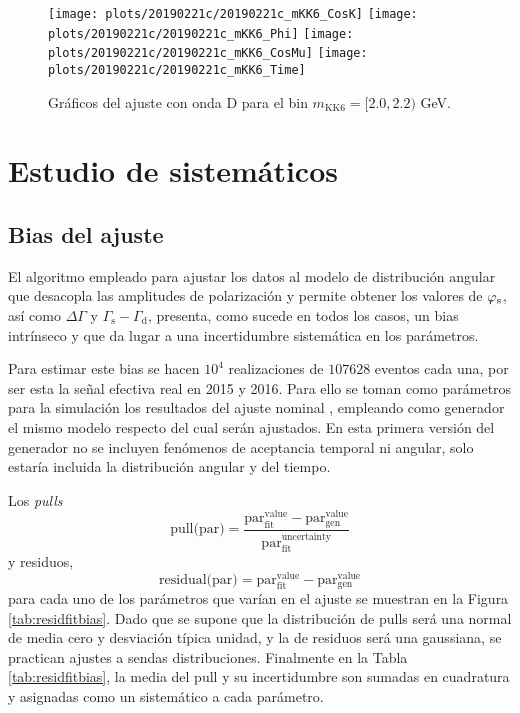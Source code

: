 \begin{figure}[H]
\centering
\begin{multicols}{2}
\texttt{[image: plots/20190221c/20190221c\_mKK6\_CosK]}
\texttt{[image: plots/20190221c/20190221c\_mKK6\_Phi]}
\texttt{[image: plots/20190221c/20190221c\_mKK6\_CosMu]}
\texttt{[image: plots/20190221c/20190221c\_mKK6\_Time]}
\end{multicols}
\vspace*{-0.5cm}
\caption{Gráficos del ajuste con onda D para el bin $m_{\text{KK}6} = [2.0,2.2)$ GeV.}  \label{fig:20190221c_mKK6}
\end{figure}







\section{Estudio de sistemáticos}

\subsection{Bias del ajuste}
\label{sec:fitbias}

El algoritmo empleado para ajustar los datos al modelo de distribución angular que desacopla las amplitudes de polarización y permite obtener los valores de $\varphi_{\text{s}}$, así como $\Delta \Gamma$ y $\Gamma_{\text{s}} - \Gamma_{\text{d}}$, presenta, como sucede en todos los casos, un bias intrínseco y que da lugar a una incertidumbre sistemática en los parámetros.

Para estimar este bias se hacen $10^4$ realizaciones de $107628$ eventos cada una, por ser esta la señal efectiva real en 2015 y 2016. Para ello se toman como parámetros para la simulación los resultados del ajuste nominal \cite{paperPhis}, empleando como generador el mismo modelo respecto del cual serán ajustados. En esta primera versión del generador no se incluyen fenómenos de aceptancia temporal ni angular, solo estaría incluida la distribución angular y del tiempo.

Los \textit{pulls} 
\begin{equation}
  \text{pull(par)} = \mathrm{ \frac{ par_{fit}^{value} - par_{gen}^{value} }{ par_{fit}^{uncertainty} } }
\end{equation}
y residuos,
\begin{equation}
  \text{residual(par)} = \mathrm{  par_{fit}^{value} - par_{gen}^{value} } 
\end{equation}
para cada uno de los parámetros que varían en el ajuste se muestran en la Figura \ref{tab:residfitbias}. Dado que se supone que la distribución de pulls será una normal de media cero y desviación típica unidad, y la de residuos será una gaussiana, se practican ajustes a sendas distribuciones. Finalmente en la Tabla \ref{tab:residfitbias}, la media del pull y su incertidumbre son sumadas en cuadratura y asignadas como un sistemático a cada parámetro. 

